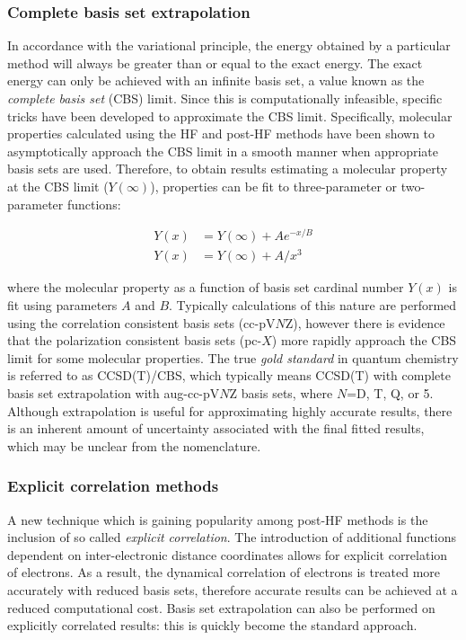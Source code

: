 \subsubsection{Complete basis set extrapolation}

In accordance with the variational principle, the energy obtained by a
particular method will always be greater than or equal to the exact energy. The
exact energy can only be achieved with an infinite basis set, a value known as
the \emph{complete basis set} (CBS) limit.\cite{Truhlar1998} Since this is
computationally infeasible, specific tricks have been developed to approximate
the CBS limit. Specifically, molecular properties calculated using the HF and
post-HF methods have been shown to asymptotically approach the CBS limit in a
smooth manner when appropriate basis sets are used. Therefore, to obtain
results estimating a molecular property at the CBS limit ($Y(\infty)$),
properties can be fit to three-parameter\cite{Feller1992,Feller1993} or
two-parameter functions:\cite{Helgaker1997,Halkier1998}

\begin{align}
  Y(x) &= Y(\infty) + Ae^{-x/B} \\
  Y(x) &= Y(\infty) + A/x^3
\end{align}

\noindent where the molecular property as a function of basis set cardinal
number $Y(x)$ is fit using parameters $A$ and $B$. Typically calculations of
this nature are performed using the correlation consistent basis sets
(cc-pV$N$Z), however there is evidence that the polarization consistent basis
sets (pc-$X$) more rapidly approach the CBS limit for some molecular
properties.\cite{Kupka2007} The true \emph{gold standard} in quantum chemistry
is referred to as CCSD(T)/CBS, which typically means CCSD(T) with complete
basis set extrapolation with aug-cc-pV$N$Z basis sets, where $N$=D, T, Q, or 5.
Although extrapolation is useful for approximating highly accurate results,
there is an inherent amount of uncertainty associated with the final fitted
results, which may be unclear from the nomenclature.

\subsubsection{Explicit correlation methods}

A new technique which is gaining popularity among post-HF methods is the
inclusion of so called \emph{explicit correlation}.\cite{Shiozaki2008,Kohn2008}
The introduction of additional functions dependent on inter-electronic distance
coordinates allows for explicit correlation of electrons.\cite{Tenno2012} As a
result, the dynamical correlation of electrons is treated more accurately with
reduced basis sets, therefore accurate results can be achieved at a reduced
computational cost. Basis set extrapolation can also be performed on explicitly
correlated results: this is quickly become the standard
approach.\cite{Feller2013}


